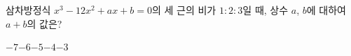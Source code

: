 삼차방정식 $x^3-12x^2+ax+b=0$의 세 근의 비가 $1:2:3$일 때, 상수 $a$, $b$에 대하여 $a+b$의 값은?
\begin{choices32}{$-7$}{$-6$}{$-5$}{$-4$}{$-3$}\end{choices32}

